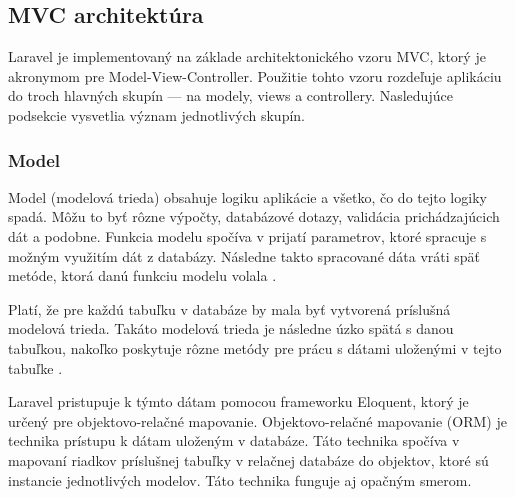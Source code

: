 \subsection{MVC architektúra}
Laravel je implementovaný na základe architektonického vzoru MVC, ktorý je akronymom pre Model-View-Controller. Použitie tohto vzoru rozdeľuje aplikáciu do troch hlavných skupín --- na modely, views a controllery. Nasledujúce podsekcie vysvetlia význam jednotlivých skupín.

\subsubsection{Model}
Model (modelová trieda) obsahuje logiku aplikácie a všetko, čo do tejto logiky spadá. Môžu to byť rôzne výpočty, databázové dotazy, validácia prichádzajúcich dát a podobne. Funkcia modelu spočíva v prijatí parametrov, ktoré spracuje s možným využitím dát z databázy. Následne takto spracované dáta vráti späť metóde, ktorá danú funkciu modelu volala \cite{mvc-architektura}.

Platí, že pre každú tabuľku v databáze by mala byť vytvorená príslušná modelová trieda. Takáto modelová trieda je následne úzko spätá s danou tabuľkou, nakoľko poskytuje rôzne metódy pre prácu s dátami uloženými v tejto tabuľke \cite{co-je-eloquent}.

Laravel pristupuje k týmto dátam pomocou frameworku Eloquent, ktorý je určený pre objektovo-relačné mapovanie.
Objektovo-relačné mapovanie (ORM) je technika prístupu k dátam uloženým v databáze. Táto technika spočíva v mapovaní riadkov príslušnej tabuľky v relačnej databáze do objektov, ktoré sú instancie jednotlivých modelov. Táto technika funguje aj opačným smerom.

